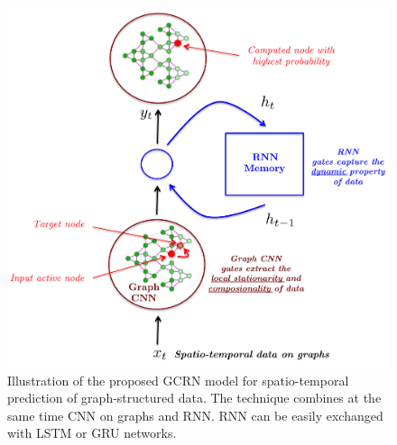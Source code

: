 \documentclass{article}
\begin{document}
\begin{figure}[t]
	\begin{minipage}[t]{0.59\linewidth}
		\includegraphics[width=\linewidth]{gcnn_rnn}
		\caption{Illustration of the proposed GCRN model for spatio-temporal prediction of graph-structured data. The technique combines at the same time CNN on graphs and RNN. RNN can be easily exchanged with LSTM or GRU networks.}
		\label{fig:gcrn}
	\end{minipage} \hfill
	\begin{minipage}[t]{0.37\linewidth}

\end{minipage}
\end{figure}
\end{document}

